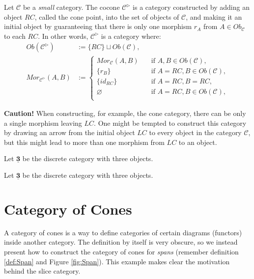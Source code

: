 \begin{definition}
	Let $\mathcal C$ be a \textit{small} category. The cocone $\mathcal C^{\rhd}$ is a category constructed
	by adding an object $RC$, called the cone point, into the set of objects of $\mathcal C$,
	and making it an initial object by guaranteeing that there is only one morphism $r_A$ from $A \in Ob_\mathcal C$ to each
	$RC$. In other words, $\mathcal C^{\rhd}$ is a category where:
	\begin{align*}
		Ob(\mathcal C^{\rhd})        & := \{RC\} \sqcup Ob(\mathcal C), \\
		Mor_{\mathcal C^{\rhd}}(A,B) & :=
		\begin{cases}
			Mor_\mathcal C (A,B)  \quad & \text{if } A,B \in Ob(\mathcal C),       \\
			\{r_B\} \quad               & \text{if } A = RC, B \in Ob(\mathcal C), \\
			\{id_{RC}\}  \quad          & \text{if } A = RC, B = RC,               \\
			\varnothing  \quad          & \text{if } A = RC, B \in Ob(\mathcal C), \\
		\end{cases}
	\end{align*}
\end{definition}

\textbf{Caution!} When constructing, for example, the cone category, there can
be only a single morphism leaving $LC$. One might be tempted to construct this
category by drawing an arrow from the initial object $LC$ to every object
in the category $\mathcal C$, but this might lead to more than one morphism
from $LC$ to an object.

\begin{example}
	Let $\mathbf{\underline{3}}$ be the discrete category with three objects.
\end{example}

\begin{example}
	Let $\mathbf{\underline{3}}$ be the discrete category with three objects.
\end{example}


\section{Category of Cones}

A category of cones is a way to define categories of certain diagrams (functors) inside another category.
The definition by itself is very obscure, so we instead present how to construct the category of
cones for \textit{spans} (remember definition \ref{def:Span} and Figure \ref{fig:Span}).
This example makes clear the motivation behind the slice category.

